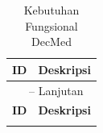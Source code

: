 \begin{longtable}{|p{0.8cm}|p{11.5cm}|}
	\caption{Kebutuhan Fungsional DecMed \autocite{sadewa2025decmed}}
	\label{tab:kebutuhan-fungsional-decmed}                                                                                                                      \\
	\hline
	\textbf{ID} & \textbf{Deskripsi}                                                                                                                             \\
	\hline
	\endfirsthead

	\multicolumn{2}{c}{\tablename\ \thetable{} -- Lanjutan}                                                                                                      \\
	\hline
	\textbf{ID} & \textbf{Deskripsi}                                                                                                                             \\
	\hline
	\endhead

	\hline
	\endfoot


\end{longtable}
